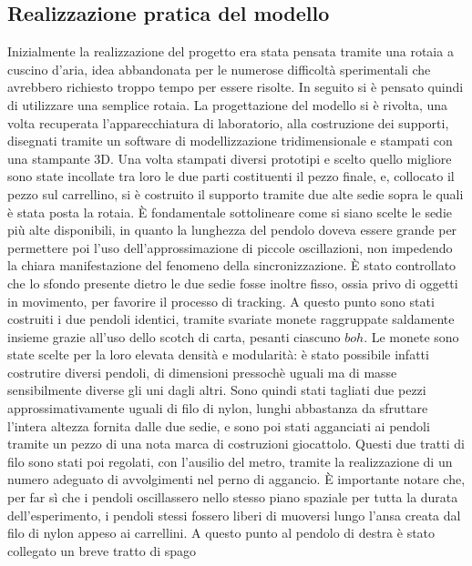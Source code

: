\documentclass[11pt, a4paper, twoside]{article}
\begin{document}
\subsection{Realizzazione pratica del modello}
Inizialmente la realizzazione del progetto era stata pensata tramite 
una rotaia a cuscino d'aria, idea abbandonata per le numerose difficoltà sperimentali
che avrebbero richiesto troppo tempo per essere risolte.
In seguito si è pensato quindi di utilizzare una semplice rotaia.
La progettazione del modello si è rivolta, una volta recuperata l'apparecchiatura
di laboratorio, alla costruzione dei supporti, disegnati tramite un
software di modellizzazione tridimensionale e stampati con una stampante 3D.
Una volta stampati diversi prototipi e scelto quello migliore sono state incollate
tra loro le due parti costituenti il pezzo finale, e, 
collocato il pezzo sul carrellino, si è costruito il supporto tramite due alte sedie
sopra le quali è stata posta la rotaia. 
È fondamentale sottolineare come si siano scelte le sedie più alte disponibili,
in quanto la lunghezza del pendolo doveva essere grande
per permettere poi l'uso dell'approssimazione di piccole oscillazioni,
non impedendo la chiara manifestazione del fenomeno della sincronizzazione.
È stato controllato che lo sfondo presente dietro le
due sedie fosse inoltre fisso, ossia privo di oggetti
in movimento, per favorire il processo di tracking.
A questo punto sono stati costruiti i due pendoli identici, tramite svariate 
monete raggruppate saldamente insieme grazie all'uso dello scotch di carta, 
pesanti ciascuno $boh$.
Le monete sono state scelte per la loro elevata densità e modularità: è 
stato possibile infatti costrutire diversi pendoli, di dimensioni pressochè
uguali ma di masse sensibilmente diverse gli uni dagli altri.
Sono quindi stati tagliati due pezzi approssimativamente
uguali di filo di nylon, lunghi abbastanza da sfruttare l'intera altezza 
fornita dalle due sedie, e sono poi stati agganciati ai pendoli tramite un pezzo di una nota 
marca di costruzioni giocattolo. Questi due tratti di filo sono stati poi regolati,
con l'ausilio del metro,
tramite la realizzazione di un numero adeguato di avvolgimenti nel perno di 
aggancio.
È importante notare che, per far sì che i pendoli oscillassero nello stesso piano
spaziale per tutta la durata dell'esperimento, i pendoli stessi fossero
liberi di muoversi lungo l'ansa creata dal filo di nylon appeso ai carrellini. 
A questo punto al pendolo di destra è stato collegato un breve tratto di spago 
\end{document}
